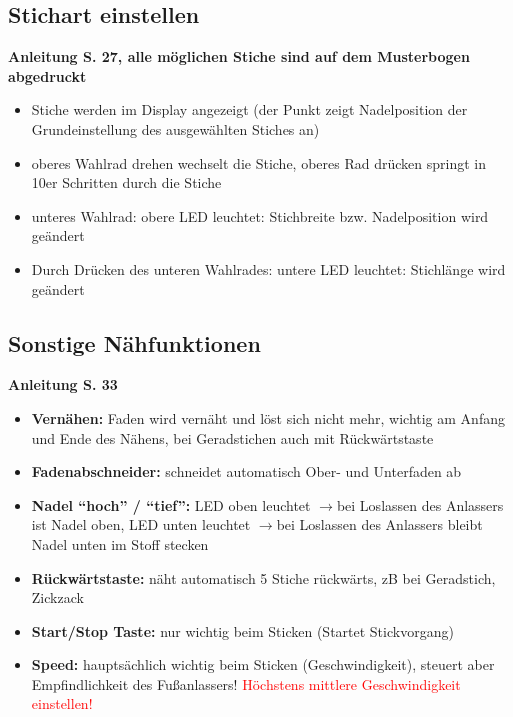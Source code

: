 \documentclass{\basedir/fablab-document}
\newcommand{\pfeil}{\ensuremath{\rightarrow}}
\begin{document}
\subsection{Stichart einstellen}
\textbf{Anleitung S. 27, alle möglichen Stiche sind auf dem Musterbogen abgedruckt}
\begin{itemize}
 \item Stiche werden im Display angezeigt (der Punkt zeigt Nadelposition der Grundeinstellung des ausgewählten Stiches an)
 \item oberes Wahlrad drehen wechselt die Stiche, oberes Rad drücken springt in 10er Schritten durch die Stiche
 \item unteres Wahlrad: obere LED leuchtet: Stichbreite bzw. Nadelposition wird geändert
 \item Durch Drücken des unteren Wahlrades: untere LED leuchtet: Stichlänge wird geändert
\end{itemize}

\subsection{Sonstige Nähfunktionen}
\textbf{Anleitung S. 33}
\begin{itemize}
 \item \textbf{Vernähen:} Faden wird vernäht und löst sich nicht mehr, wichtig am Anfang und Ende des Nähens, bei Geradstichen auch mit Rückwärtstaste
 \item \textbf{Fadenabschneider:} schneidet automatisch Ober- und Unterfaden ab
 \item \textbf{Nadel ``hoch'' / ``tief'':} LED oben leuchtet \pfeil bei Loslassen des Anlassers ist Nadel oben, LED unten leuchtet \pfeil bei Loslassen des Anlassers bleibt Nadel unten im Stoff stecken 
 \item \textbf{Rückwärtstaste:} näht automatisch 5 Stiche rückwärts, zB bei Geradstich, Zickzack
 \item \textbf{Start/Stop Taste:} nur wichtig beim Sticken (Startet Stickvorgang)
 \item \textbf{Speed:} hauptsächlich wichtig beim Sticken (Geschwindigkeit), steuert aber Empfindlichkeit des Fußanlassers! \textcolor{red}{Höchstens mittlere Geschwindigkeit einstellen!}
\end{itemize}

\newpage
{}
\end{document}
